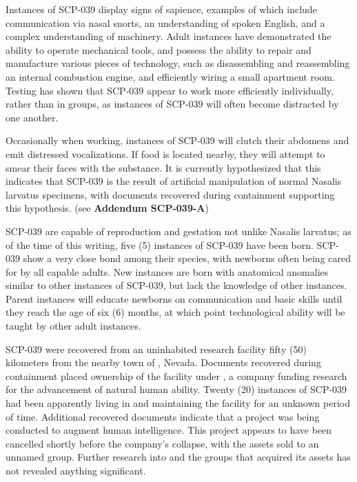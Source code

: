 Instances of SCP-039 display signs of sapience, examples of which include communication via nasal snorts, an understanding of spoken English, and a complex understanding of machinery. Adult instances have demonstrated the ability to operate mechanical tools, and possess the ability to repair and manufacture various pieces of technology, such as disassembling and reassembling an internal combustion engine, and efficiently wiring a small apartment room. Testing has shown that SCP-039 appear to work more efficiently individually, rather than in groups, as instances of SCP-039 will often become distracted by one another.

Occasionally when working, instances of SCP-039 will clutch their abdomens and emit distressed vocalizations. If food is located nearby, they will attempt to smear their faces with the substance. It is currently hypothesized that this indicates that SCP-039 is the result of artificial manipulation of normal Nasalis larvatus specimens, with documents recovered during containment supporting this hypothesis. (see \textbf{Addendum SCP-039-A})

SCP-039 are capable of reproduction and gestation not unlike Nasalis larvatus; as of the time of this writing, five (5) instances of SCP-039 have been born. SCP-039 show a very close bond among their species, with newborns often being cared for by all capable adults. New instances are born with anatomical anomalies similar to other instances of SCP-039, but lack the knowledge of other instances. Parent instances will educate newborns on communication and basic skills until they reach the age of six (6) months, at which point technological ability will be taught by other adult instances.

SCP-039 were recovered from an uninhabited research facility fifty (50) kilometers from the nearby town of , Nevada. Documents recovered during containment placed ownership of the facility under  , a company funding research for the advancement of natural human ability. Twenty (20) instances of SCP-039 had been apparently living in and maintaining the facility for an unknown period of time. Additional recovered documents indicate that a project was being conducted to augment human intelligence. This project appears to have been cancelled shortly before the company's collapse, with the assets sold to an unnamed group. Further research into   and the groups that acquired its assets has not revealed anything significant.

